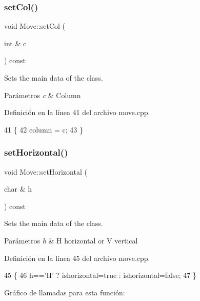 \subsubsection{\texorpdfstring{set\+Col()}{setCol()}}
{\footnotesize\ttfamily void Move\+::set\+Col (\begin{DoxyParamCaption}\item[{int \&}]{c }\end{DoxyParamCaption}) const}



Sets the main data of the class. 


\begin{DoxyParams}{Parámetros}
{\em c} & Column \\
\hline
\end{DoxyParams}


Definición en la línea 41 del archivo move.\+cpp.


\begin{DoxyCode}
41                              \{
42     column = c;
43 \}
\end{DoxyCode}
\mbox{\label{classMove_a9bbcfaffef5c4c0ca0ca8ffda928f1c1}} 
\subsubsection{\texorpdfstring{set\+Horizontal()}{setHorizontal()}}
{\footnotesize\ttfamily void Move\+::set\+Horizontal (\begin{DoxyParamCaption}\item[{char \&}]{h }\end{DoxyParamCaption}) const}



Sets the main data of the class. 


\begin{DoxyParams}{Parámetros}
{\em h} & \textquotesingle{}H\textquotesingle{} horizontal or \textquotesingle{}V\textquotesingle{} vertical \\
\hline
\end{DoxyParams}


Definición en la línea 45 del archivo move.\+cpp.


\begin{DoxyCode}
45                                     \{
46     h==\textcolor{charliteral}{'H'} ? ishorizontal=true : ishorizontal=\textcolor{keyword}{false};
47 \}
\end{DoxyCode}
Gráfico de llamadas para esta función\+:
\mbox{\label{classMove_ac9141b7ec4d5dd5933c3239c9132423b}} 
